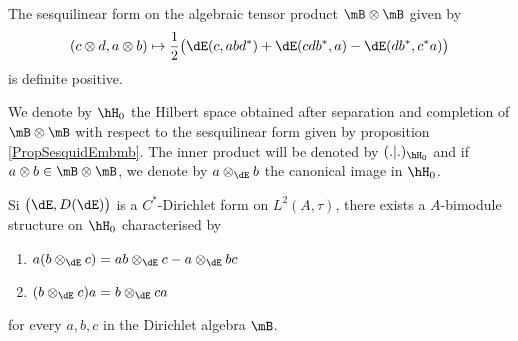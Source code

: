 \begin{proposition}		\label{PropSesquidEmbmb}
	The sesquilinear form on the algebraic tensor product $\mB\otimes\mB$ given by
	\begin{equation}
		(c\otimes d,a\otimes b)\mapsto\frac{ 1 }{2}\big( \dE(c,abd^*)+\dE(cdb^*,a)-\dE(db^*,c^*a) \big)
	\end{equation}
	is definite positive.
\end{proposition}

We denote by $\hH_0$ the Hilbert space obtained after separation\cite{AlgOpGirard} and completion of $\mB\otimes\mB$ with respect to the sesquilinear form given by proposition \ref{PropSesquidEmbmb}. The inner product will be denoted by $(.|.)_{\hH_0}$ and if $a\otimes b\in\mB\otimes\mB$, we denote by $a\otimes_{\dE}b$ the canonical image in $\hH_0$.

\begin{theorem}
	Si $\big( \dE,D(\dE) \big)$ is a $C^*$-Dirichlet form on $L^2(A,\tau)$, there exists a $A$-bimodule structure on $\hH_0$ characterised by
	\begin{enumerate}
		\item
			$a(b\otimes_{\dE}c)=ab\otimes_{\dE}c-a\otimes_{\dE}bc$
		\item
			$(b\otimes_{\dE}c)a=b\otimes_{\dE}ca$
	\end{enumerate}
	for every $a,b,c$ in the Dirichlet algebra $\mB$.
\end{theorem}
